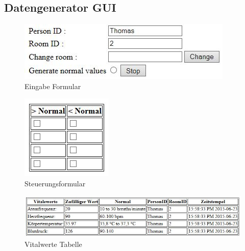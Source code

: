 \subsection{Datengenerator GUI}
\begin{figure}[H]
	\begin{center}
		\includegraphics[scale=0.9]{images/eingabe-formular.jpg}
		\caption{Eingabe Formular}
	\end{center}
\end{figure}
\begin{figure}[H]
	\begin{center}
		\includegraphics[scale=0.9]{images/kritische-werte-tabelle.jpg}
		\caption{Steuerungsformular}
	\end{center}
\end{figure}
\begin{figure}[H]
	\begin{center}
		\includegraphics[scale=0.9]{images/vitalwerte-tabelle.jpg}
		\caption{Vitalwerte Tabelle}
	\end{center}
\end{figure}

